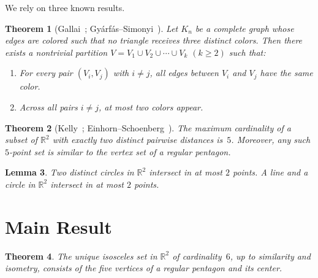 \documentclass[12pt]{amsart}
\newtheorem{theorem}{Theorem}
\newtheorem{lemma}[theorem]{Lemma}
\theoremstyle{definition}
\begin{document}
We rely on three known results.

\begin{theorem}[Gallai~\cite{Ga67}; Gy\'arf\'as--Simonyi~\cite{GS04}]\label{thm:gallai}
Let $K_n$ be a complete graph whose edges are colored such that no triangle receives three distinct colors. Then there exists a nontrivial partition $V = V_1 \cup V_2 \cup \cdots \cup V_k$ $(k \geq 2)$ such that:
\begin{enumerate}
\item For every pair $(V_i, V_j)$ with $i \neq j$, all edges between $V_i$ and $V_j$ have the same color.
\item Across all pairs $i \neq j$, at most two colors appear.
\end{enumerate}
\end{theorem}

\begin{theorem}[Kelly~\cite{ErKe47}; Einhorn--Schoenberg~\cite{ES66}]\label{thm:twodist}
The maximum cardinality of a subset of\/ $\mathbb{R}^2$ with exactly two distinct pairwise distances is~$5$. Moreover, any such $5$-point set is similar to the vertex set of a regular pentagon.
\end{theorem}

\begin{lemma}\label{lem:circles}
Two distinct circles in\/ $\mathbb{R}^2$ intersect in at most $2$ points. A line and a circle in\/ $\mathbb{R}^2$ intersect in at most $2$ points.
\end{lemma}

\section{Main Result}

\begin{theorem}\label{thm:main}
The unique isosceles set in\/ $\mathbb{R}^2$ of cardinality~$6$, up to similarity and isometry, consists of the five vertices of a regular pentagon and its center.
\end{theorem}
\end{document}
